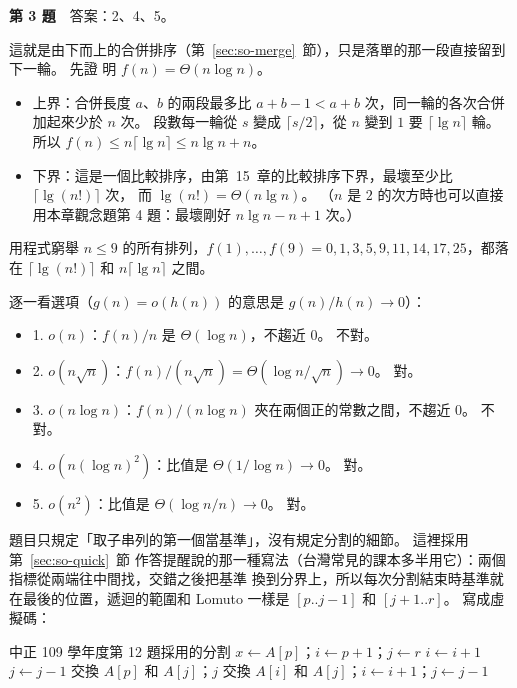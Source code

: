 \textbf{第 3 題}　答案：2、4、5。

這就是由下而上的合併排序（第~\ref{sec:so-merge}~節），只是落單的那一段直接留到下一輪。 先證
明 $f(n) = \Theta(n \log n)$。
\begin{itemize}
\item 上界：合併長度 $a$、$b$ 的兩段最多比 $a + b - 1 < a + b$ 次，同一輪的各次合併加起來少於
$n$ 次。 段數每一輪從 $s$ 變成 $\lceil s/2 \rceil$，從 $n$ 變到 $1$ 要 $\lceil \lg n \rceil$ 輪。
所以 $f(n) \le n \lceil \lg n \rceil \le n \lg n + n$。
\item 下界：這是一個比較排序，由第~15~章的比較排序下界，最壞至少比 $\lceil \lg(n!) \rceil$ 次，
而 $\lg(n!) = \Theta(n \lg n)$。 （$n$ 是 $2$ 的次方時也可以直接用本章觀念題第 4 題：最壞剛好
$n \lg n - n + 1$ 次。）
\end{itemize}
用程式窮舉 $n \le 9$ 的所有排列，$f(1), \ldots, f(9) = 0, 1, 3, 5, 9, 11, 14, 17, 25$，都落在
$\lceil \lg(n!) \rceil$ 和 $n \lceil \lg n \rceil$ 之間。

逐一看選項（$g(n) = o(h(n))$ 的意思是 $g(n)/h(n) \to 0$）：
\begin{itemize}
\item 1. $o(n)$：$f(n)/n$ 是 $\Theta(\log n)$，不趨近 $0$。 不對。
\item 2. $o(n\sqrt{n})$：$f(n)/(n\sqrt{n}) = \Theta(\log n / \sqrt{n}) \to 0$。 對。
\item 3. $o(n \log n)$：$f(n)/(n \log n)$ 夾在兩個正的常數之間，不趨近 $0$。 不對。
\item 4. $o(n(\log n)^2)$：比值是 $\Theta(1/\log n) \to 0$。 對。
\item 5. $o(n^2)$：比值是 $\Theta(\log n / n) \to 0$。 對。
\end{itemize}

題目只規定「取子串列的第一個當基準」，沒有規定分割的細節。 這裡採用第~\ref{sec:so-quick}~節
作答提醒說的那一種寫法（台灣常見的課本多半用它）：兩個指標從兩端往中間找，交錯之後把基準
換到分界上，所以每次分割結束時基準就在最後的位置，遞迴的範圍和 Lomuto 一樣是 $[p..j-1]$ 和
$[j+1..r]$。 寫成虛擬碼：

\begin{pseudo}{中正 109 學年度第 12 題採用的分割}
    \State $x \gets A[p]$；$i \gets p + 1$；$j \gets r$ 
    \While{\TRUE}
            \State $i \gets i + 1$
        \EndWhile
            \State $j \gets j - 1$
        \EndWhile
            \State 交換 $A[p]$ 和 $A[j]$；\Return $j$
        \EndIf
        \State 交換 $A[i]$ 和 $A[j]$；$i \gets i + 1$；$j \gets j - 1$
    \EndWhile
\EndFunction
\end{pseudo}


